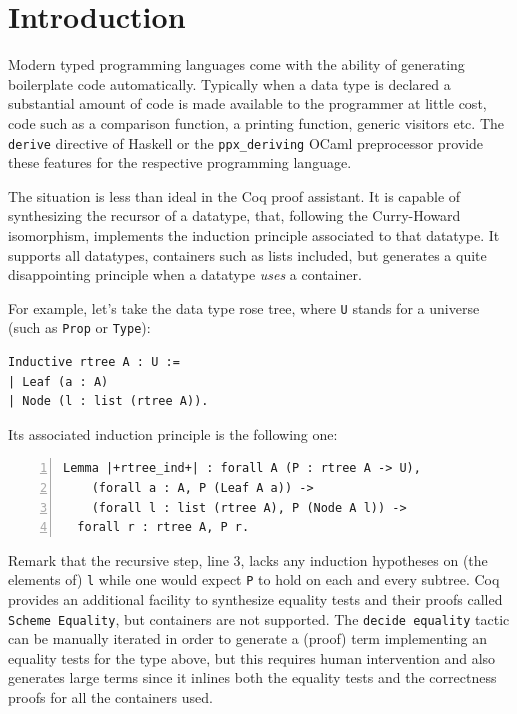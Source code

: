 \documentclass[sigplan,10pt,review]{acmart}\settopmatter{printfolios=true,printccs=false,printacmref=false}
\begin{document}
\section{Introduction}

Modern typed programming languages come with the ability of generating
boilerplate code automatically. Typically when a data type is declared
a substantial amount of code is made available to the programmer at
little cost, code such as a comparison function, a printing function,
generic visitors etc.  The \lstinline+derive+ directive of Haskell or the
\lstinline+ppx_deriving+ OCaml preprocessor provide these features for the
respective programming language.

The situation is less than ideal in the Coq proof assistant.  It is
capable of synthesizing the recursor of a datatype, that,
following the Curry-Howard isomorphism, implements the induction
principle associated to that datatype. It supports all datatypes,
containers such as lists included, but generates a quite disappointing
principle when a datatype \emph{uses} a container.

For example, let's take the data type rose tree, where \lstinline+U+
stands for a universe (such as \lstinline+Prop+ or \lstinline+Type+):

\begin{lstlisting}
Inductive rtree A : U :=
| Leaf (a : A)
| Node (l : list (rtree A)).
\end{lstlisting}

Its associated induction principle is the following one:

\begin{lstlisting}[numbers=left]
Lemma |+rtree_ind+| : forall A (P : rtree A -> U),
    (forall a : A, P (Leaf A a)) ->
    (forall l : list (rtree A), P (Node A l)) ->
  forall r : rtree A, P r.
\end{lstlisting}

Remark that the recursive step, line 3, lacks any induction hypotheses
on (the elements of) \lstinline+l+ while one would expect
\lstinline+P+ to hold on each and every subtree.  Coq provides
an additional facility to synthesize equality tests and their proofs
called \lstinline+Scheme Equality+, but containers are not supported.
The \lstinline+decide equality+ tactic can be manually iterated in
order to generate a (proof) term implementing an equality tests for
the type above, but this requires human intervention and also
generates large terms since it inlines both the equality tests and the 
correctness proofs for all the containers used.
\end{document}
